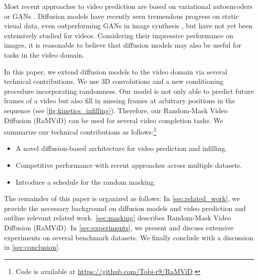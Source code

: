\documentclass[10pt]{article} \usepackage[accepted]{tmlr}
\begin{document}
Most recent approaches to video prediction are based on variational autoencoders \citep{babaeizadeh2021fitvid, saxena2021clockwork} or GANs \citep{clark_2019_dvd_gan, Luc_2020}.
Diffusion models \citep{pmlr-v37-sohl-dickstein15,ho_2020, pmlr-v139-nichol21a, song2021scorebased, abstreiter2021diffusion, mittal2022points,dockhorn2021score} have recently seen tremendous progress on static visual data, even outperforming GANs in image synthesis \citep{dhariwal2021diffusion}, but have not yet been extensively studied for videos.
Considering their impressive performance on images, it is reasonable to believe that diffusion models may also be useful for tasks in the video domain.


In this paper, we extend diffusion models to the video domain via several technical contributions. We use 3D convolutions and a new conditioning procedure incorporating randomness. Our model is not only able to predict future frames of a video but also fill in missing frames at arbitrary positions in the sequence (see \cref{fig:kinetics_infilling}). Therefore, our Random-Mask Video Diffusion (RaMViD) can be used for several video completion tasks. We summarize our technical contributions as follows:\footnote{Code is available at \url{https://github.com/Tobi-r9/RaMViD}.}
\begin{itemize}[topsep=0pt,itemsep=0pt,partopsep=0pt,parsep=\parskip]
    \item A novel diffusion-based architecture for video prediction and infilling. 
    \item Competitive performance with recent approaches across multiple datasets.
    \item Introduce a schedule for the random masking.
\end{itemize}

The remainder of this paper is organized as follows: In \cref{sec:related_work}, we provide the necessary background on diffusion models and video prediction and outline relevant related work. \cref{sec:masking} describes Random-Mask Video Diffusion (RaMViD). In \cref{sec:experiments}, we present and discuss extensive experiments on several benchmark datasets. We finally conclude with a discussion in \cref{sec:conclusion}. 
\end{document}
